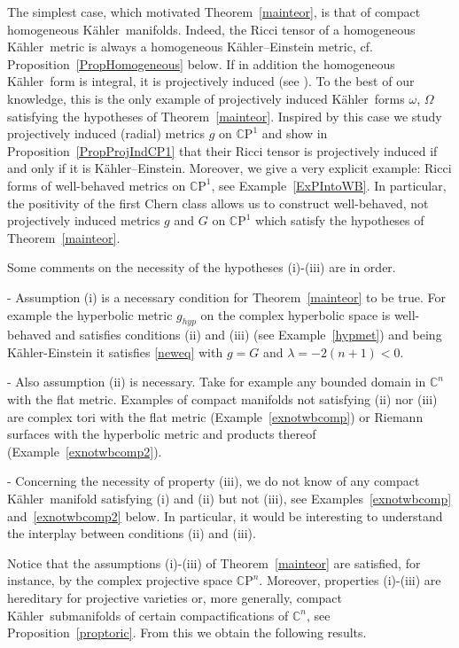 \documentclass[12pt]{amsart}
\newcommand{\CP}{\mathbb{C}\mathrm{P}}
\newcommand{\C}{\mathbb{C}}
\newcommand{\K}{K\"{a}hler}
\begin{document}
The simplest case, which motivated Theorem~\ref{mainteor}, is that of compact homogeneous \K\ manifolds.
Indeed, the Ricci tensor of a homogeneous \K\ metric is always a homogeneous \K--Einstein metric, cf. Proposition~\ref{PropHomogeneous} below. 
If in addition the homogeneous \K\ form is integral, it is projectively induced (see \cite{Takeuchi78Homogeneous,LoiZuddasGromovWidthHKM}).
To the best of our knowledge, this is the only example of projectively induced \K\ forms $\omega$, $\Omega$ satisfying the hypotheses of Theorem~\ref{mainteor}.
Inspired by this case we study projectively induced (radial) metrics $g$ on $\CP^1$ and show in Proposition~\ref{PropProjIndCP1} that their Ricci tensor is projectively induced if and only if it is \K--Einstein.
Moreover, we give a very explicit example: Ricci forms of well-behaved metrics on $\CP^1$, see Example~\ref{ExPIntoWB}. 
In particular, the positivity of the first Chern class allows us to construct well-behaved, not projectively induced metrics $g$ and $G$ on $\CP^1$ which satisfy the hypotheses of Theorem~\ref{mainteor}.



Some comments on the necessity of the hypotheses (i)-(iii) are in order.

\noindent - Assumption (i) is a necessary condition for Theorem~\ref{mainteor}
to be true. For example the hyperbolic metric $g_{hyp}$ on the complex hyperbolic space is well-behaved  and satisfies conditions (ii) and (iii) (see Example~\ref{hypmet}) and being \K-Einstein  
it satisfies \eqref{neweq} with $g=G$ and 
$\lambda=-2(n+1)<0$.

\noindent - Also assumption (ii) is necessary. Take for example any bounded domain in $\C^n$
with the flat metric. Examples of compact manifolds not satisfying (ii) nor (iii) are complex tori with the flat metric (Example~\ref{exnotwbcomp}) or Riemann surfaces with the hyperbolic metric and products thereof (Example~\ref{exnotwbcomp2}).

\noindent - Concerning the necessity of property (iii), we do not know of any compact \K\ manifold satisfying (i) and (ii) but not (iii), see Examples~\ref{exnotwbcomp} and~\ref{exnotwbcomp2} below. In particular, it would be interesting to understand the interplay between conditions (ii) and (iii).

Notice that the assumptions (i)-(iii) of Theorem~\ref{mainteor} are satisfied, for instance, by the complex projective space $\CP^n$.
Moreover, properties (i)-(iii) are hereditary for projective varieties or, more generally, compact \K\ submanifolds of certain compactifications of $\C^n$, see Proposition~\ref{proptoric}.
From this we obtain the following results.
\end{document}
